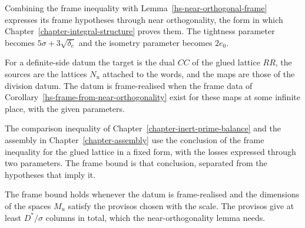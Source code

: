 Combining the frame inequality with Lemma~\ref{hs-near-orthogonal-frame} expresses its frame
hypotheses through near orthogonality, the form in which
Chapter~\ref{chapter-integral-structure} proves them. The tightness parameter becomes
$5\sigma+3\sqrt{\delta_e}$ and the isometry parameter becomes $2e_0$.

For a definite-side datum the target is the dual $CC$ of the glued lattice $RR$, the sources
are the lattices $N_u$ attached to the words, and the maps are those of the division datum. The
datum is frame-realised when the frame data of Corollary~\ref{hs-frame-from-near-orthogonality}
exist for these maps at some infinite place, with the given parameters.

The comparison inequality of Chapter~\ref{chapter-inert-prime-balance} and the assembly in
Chapter~\ref{chapter-assembly} use the conclusion of the frame inequality for the glued lattice
in a fixed form, with the losses expressed through two parameters. The frame bound is that
conclusion, separated from the hypotheses that imply it.

The frame bound holds whenever the datum is frame-realised and the dimensions of the spaces
$M_u$ satisfy the provisos chosen with the scale. The provisos give at least $D^*/\sigma$
columns in total, which the near-orthogonality lemma needs.
